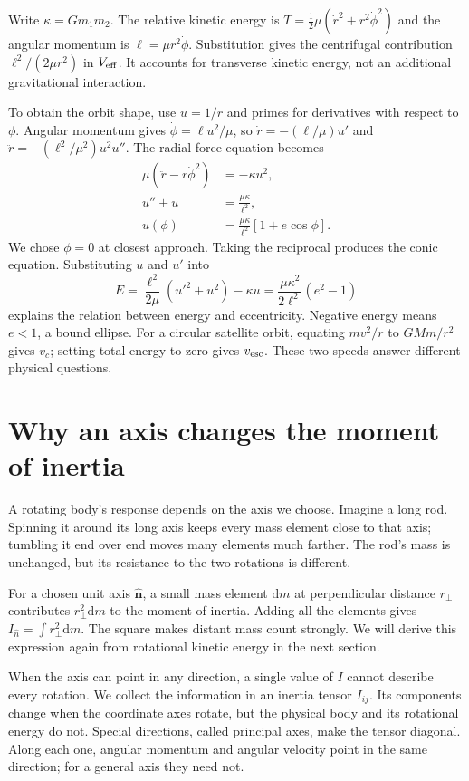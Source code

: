 \documentclass[11pt,oneside]{book}
\newcommand{\dd}{\mathrm{d}}
\newcommand{\vect}[1]{\boldsymbol{#1}}
\theoremstyle{reviewstyle}
\begin{document}
Write $\kappa=Gm_1m_2$. The relative kinetic energy is $T=\tfrac12\mu(\dot r^2+r^2\dot\phi^2)$ and the angular momentum is $\ell=\mu r^2\dot\phi$. Substitution gives the centrifugal contribution $\ell^2/(2\mu r^2)$ in $V_{\rm eff}$. It accounts for transverse kinetic energy, not an additional gravitational interaction.

To obtain the orbit shape, use $u=1/r$ and primes for derivatives with respect to $\phi$. Angular momentum gives $\dot\phi=\ell u^2/\mu$, so $\dot r=-(\ell/\mu)u'$ and $\ddot r=-(\ell^2/\mu^2)u^2u''$. The radial force equation becomes
\begin{align}
\mu(\ddot r-r\dot\phi^2)&=-\kappa u^2,\\
u''+u&=\frac{\mu\kappa}{\ell^2},\\
u(\phi)&=\frac{\mu\kappa}{\ell^2}[1+e\cos\phi].
\end{align}
We chose $\phi=0$ at closest approach. Taking the reciprocal produces the conic equation. Substituting $u$ and $u'$ into
\begin{equation}
E=\frac{\ell^2}{2\mu}(u'^2+u^2)-\kappa u
=\frac{\mu\kappa^2}{2\ell^2}(e^2-1)
\end{equation}
explains the relation between energy and eccentricity. Negative energy means $e<1$, a bound ellipse. For a circular satellite orbit, equating $mv^2/r$ to $GMm/r^2$ gives $v_c$; setting total energy to zero gives $v_{\rm esc}$. These two speeds answer different physical questions.

\section{Why an axis changes the moment of inertia}
A rotating body's response depends on the axis we choose. Imagine a long rod. Spinning it around its long axis keeps every mass element close to that axis; tumbling it end over end moves many elements much farther. The rod's mass is unchanged, but its resistance to the two rotations is different.

For a chosen unit axis $\hat{\vect n}$, a small mass element $\dd m$ at perpendicular distance $r_\perp$ contributes $r_\perp^2\dd m$ to the moment of inertia. Adding all the elements gives $I_{\hat n}=\int r_\perp^2\dd m$. The square makes distant mass count strongly. We will derive this expression again from rotational kinetic energy in the next section.

When the axis can point in any direction, a single value of $I$ cannot describe every rotation. We collect the information in an inertia tensor $I_{ij}$. Its components change when the coordinate axes rotate, but the physical body and its rotational energy do not. Special directions, called principal axes, make the tensor diagonal. Along each one, angular momentum and angular velocity point in the same direction; for a general axis they need not.
\end{document}
